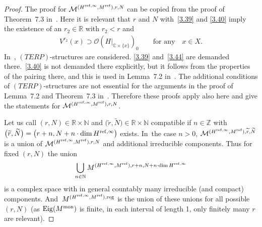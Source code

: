 \documentclass[pdftex]{sigma}%
\numberwithin{equation}{section}
\numberwithin{figure}{section}
\newcommand{\N}{{\mathbb N}}
\newcommand{\Z}{{\mathbb Z}}
\newcommand{\C}{{\mathbb C}}
\newcommand{\R}{{\mathbb R}}
\newcommand{\MM}{{\mathcal M}}
\newcommand{\OO}{{\mathcal O}}
\newcommand{\www}{\widetilde}
\DeclareMathOperator{\Eig}{Eig}
\begin{document}
\begin{proof} The proof for $\MM^{(H^{{\rm ref},\infty},M^{\rm ref}),r,N}$
can be copied from the proof of Theorem~7.3 in~\cite{HS10}.
Here it is relevant that $r$ and $N$ with~\eqref{3.39} and
\eqref{3.40} imply the existence of an $r_2\in \R$ with $r_2<r$
and
\begin{gather}\label{3.44}
V^{r_2}(x)\supset \OO(H|_{\C\times\{x\}})_0
\qquad\text{for any}\quad x\in X.
\end{gather}
In~\cite{HS10}, $(TERP)$-structures are considered.
\eqref{3.39} and~\eqref{3.44} are demanded there.~\eqref{3.40} is not
demanded there explicitly, but it follows from the properties
of the pairing there, and this is used in Lemma~7.2 in~\cite{HS10}.
The additional conditions of $(TERP)$-structures are not
essential for the arguments in the proof of Lemma~7.2 and
Theorem~7.3 in~\cite{HS10}. Therefore these proofs apply
also here and give the statements for
$\MM^{(H^{{\rm ref},\infty},M^{\rm ref}),r,N}$.

Let us call $(r,N)\in\R\times \N$ and
$\big(\www r,\www N\big)\in\R\times \N$ compatible if $n\in\Z$
with $\big(\www r,\www N\big)=\big(r+n,\allowbreak N+n\cdot\dim H^{{\rm ref},\infty}\big)$ exists. In~the case $n>0$,
$\MM^{(H^{{\rm ref},\infty},M^{\rm ref}),\www r,\www N}$ is a union of
$\MM^{(H^{{\rm ref},\infty},M^{\rm ref}),r,N}$ and additional irreducible
components. Thus for fixed $(r,N)$ the union
\[
\bigcup_{n\in\N}M^{(H^{{\rm ref},\infty},M^{\rm ref}),r+n,N+n\cdot\dim H^{{\rm ref},\infty}}
\]
is a complex space with in general countably many irreducible
(and compact) components.
And~$M^{(H^{{\rm ref},\infty},M^{\rm ref}),{\rm reg}}$ is the union
of these unions for all possible $(r,N)$
(as $\Eig(M^{\rm mon})$ is finite, in each interval of length
1, only finitely many $r$ are relevant).
\end{proof}
\end{document}
